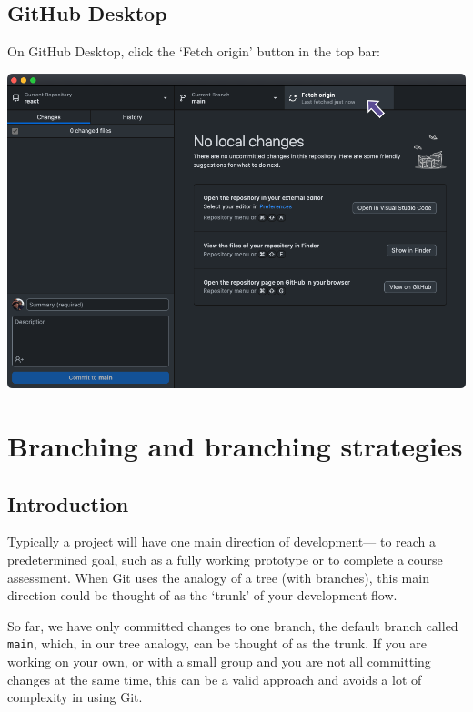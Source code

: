 \documentclass[
  letterpaper,
  DIV=11,
  numbers=noendperiod]{scrartcl}
\begin{document}
\subsection{GitHub Desktop}

On GitHub Desktop, click the `Fetch origin' button in the top bar:

\includegraphics{images/image26.png}

\hypertarget{branching-and-branching-strategies}{%
\section{Branching and branching
strategies}\label{branching-and-branching-strategies}}

\hypertarget{introduction}{%
\subsection{Introduction}\label{introduction}}

Typically a project will have one main direction of development--- to
reach a predetermined goal, such as a fully working prototype or to
complete a course assessment. When Git uses the analogy of a tree (with
branches), this main direction could be thought of as the `trunk' of
your development flow.

So far, we have only committed changes to one branch, the default branch
called \texttt{main}, which, in our tree analogy, can be thought of as
the trunk. If you are working on your own, or with a small group and you
are not all committing changes at the same time, this can be a valid
approach and avoids a lot of complexity in using Git.
\end{document}
